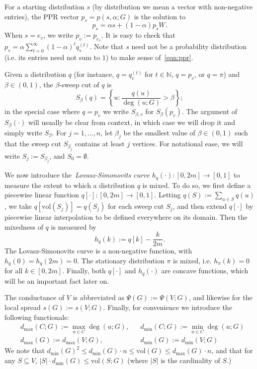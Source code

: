 \documentclass[twoside,11pt]{article}
\newcommand{\set}[1]{\left\{#1\right\}}
\newcommand{\1}{\mathbf{1}}
\newcommand{\vol}{\mathrm{vol}}
\begin{document}
For a starting distribution $s$ (by distribution we mean a vector with non-negative entries), the PPR vector $p_s = p(s,\alpha;G)$ is the solution to
\begin{equation}
\label{eqn:ppr}
p_s = \alpha s + (1 - \alpha) p_s W.
\end{equation}
When $s = e_v$, we write $p_v := p_{e_v}$. It is easy to check that $p_s = \alpha \sum_{t = 0}^{\infty} (1 - \alpha)^t q_s^{(t)}$.  Note that $s$ need not be a probability distribution (i.e. its entries need not sum to $1$) to make sense of~\eqref{eqn:ppr}.

Given a distribution $q$ (for instance, $q = q_v^{(t)}$ for $t \in \mathbb{N}$, $q = p_v$, or $q = \pi$) and $\beta \in (0,1)$, the $\beta$-sweep cut of $q$ is
\begin{equation*}
S_{\beta}(q) = \set{u: \frac{q(u)}{\deg(u;G)} > \beta};
\end{equation*} 
in the special case where $q = p_v$ we write $S_{\beta,v}$ for $S_{\beta}(p_v)$. The argument of $S_{\beta}(\cdot)$ will usually be clear from context, in which case we will drop it and simply write $S_{\beta}$. For $j = 1,\ldots,n$, let $\beta_j$ be the smallest value of $\beta \in (0,1)$ such that the sweep cut $S_{\beta_j}$ contains at least $j$ vertices. For notational ease, we will write $S_j := S_{\beta_j}$, and $S_0 = \emptyset$. 

We now introduce the~\emph{Lovasz-Simonovits curve} $h_q(\cdot): [0,2m] \to [0,1]$ to measure the extent to which a distribution $q$ is mixed. To do so, we first define a piecewise linear function $q[\cdot]: [0,2m] \to [0,1]$. Letting $q(S) := \sum_{u \in S} q(u)$, we take $q[\vol(S_j)] = q(S_j)$ for each sweep cut $S_j$, and then extend $q[\cdot]$ by piecewise linear interpolation to be defined everywhere on its domain. Then the mixedness of $q$ is measured by
\begin{equation*}
h_q(k) := q[k] - \frac{k}{2m}.
\end{equation*}
The Lovasz-Simonovits curve is a non-negative function, with $h_q(0) = h_q(2m) = 0$. The stationary distribution $\pi$ is mixed, i.e. $h_{\pi}(k) = 0$ for all $k \in [0,2m]$. Finally, both $q[\cdot]$ and $h_q(\cdot)$ are concave functions, which will be an important fact later on.  

The conductance of $V$ is abbreviated as $\Psi(G) := \Psi(V;G)$, and likewise for the local spread $s(G) := s(V;G)$. Finally, for convenience we introduce the following functionals:
\begin{equation*}
\begin{aligned}
& d_{\max}(C; G) := \max_{u \in C} \deg(u; G), && d_{\min}(C; G) := \min_{u \in C} \deg(u;G) \\
& d_{\max}(G) := d_{\max}(V;G),~~ && d_{\min}(G) := d_{\min}(V; G)
\end{aligned}
\end{equation*}
We note that $d_{\min}(G)^2 \leq d_{\min}(G) \cdot n \leq \vol(G) \leq d_{\max}(G) \cdot n$, and that for any $S \subseteq V$, $|S| \cdot d_{\min}(G) \leq \vol(S;G)$ (where $|S|$ is the cardinality of $S$.) \\
\end{document}
